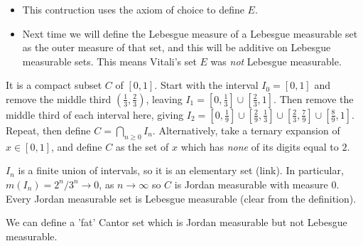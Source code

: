 \documentclass{article}
\begin{document}
\begin{remark} \leavevmode
    \begin{itemize}
        \item This contruction uses the axiom of choice to define $E$.
        \item Next time we will define the Lebesgue measure of a Lebesgue measurable set as the outer measure of that set, and this will be additive on Lebesgue measurable sets.  This means Vitali's set $E$ was \emph{not} Lebesgue measurable.
    \end{itemize}
\end{remark}

\begin{eg} 
    It is a compact subset $C$ of $[0, 1]$.  Start with the interval $I_0 = [0, 1]$ and remove the middle third $(\frac13, \frac23)$, leaving $I_1 = [0, \frac13] \cup [\frac23, 1]$.  Then remove the middle third of each interval here, giving $I_2 = [0, \frac19] \cup [\frac29, \frac13] \cup [\frac23, \frac79] \cup [\frac89, 1]$.  Repeat, then define $C = \bigcap_{n \geq 0} I_n$.  Alternatively, take a ternary expansion of $x \in [0, 1]$, and define $C$ as the set of $x$ which has \emph{none} of its digits equal to $2$.
\end{eg}

\begin{remark}
    $I_n$ is a finite union of intervals, so it is an elementary set (link). In particular, $m(I_n) = 2^n / 3^n \to 0$, as $n \to \infty$ so $C$ is Jordan measurable with measure $0$.
    Every Jordan measurable set is Lebesgue measurable (clear from the definition).
\end{remark}
We can define a 'fat' Cantor set which is Jordan measurable but not Lebesgue measurable.
\end{document}
